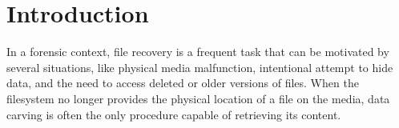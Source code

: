 \chapter{Introduction}

In a forensic context, file recovery is a frequent task that can be motivated by several situations, like physical media malfunction, intentional attempt to hide data, and the need to access deleted or older versions of files. When the filesystem no longer provides the physical location of a file on the media, data carving is often the only procedure capable of retrieving its content.



